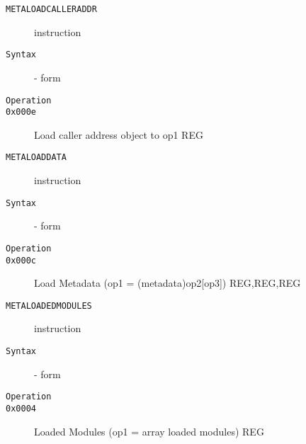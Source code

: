 \clearpage
\begin{description}
\item[\texttt{METALOADCALLERADDR}] instruction\\
\item[\texttt{Syntax}] - form \\

\item[\texttt{Operation}]
\item[\texttt{}]
\item[\texttt{0x000e}]         Load caller address object to op1  {REG}       \\
\end{description}
\clearpage
\begin{description}
\item[\texttt{METALOADDATA}] instruction\\
\item[\texttt{Syntax}] - form \\

\item[\texttt{Operation}]
\item[\texttt{}]
\item[\texttt{0x000c}]   Load Metadata (op1 = (metadata)op2[op3])  {REG,REG,REG}     \\
\end{description}
\clearpage
\begin{description}
\item[\texttt{METALOADEDMODULES}] instruction\\
\item[\texttt{Syntax}] - form \\

\item[\texttt{Operation}]
\item[\texttt{}]
\item[\texttt{0x0004}]        Loaded Modules (op1 = array loaded modules)  {REG}        \\
\end{description}
